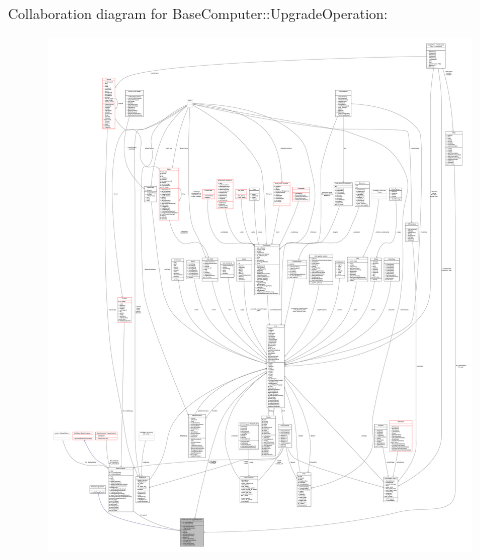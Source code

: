 Collaboration diagram for Base\+Computer\+:\+:Upgrade\+Operation\+:
\nopagebreak
\begin{figure}[H]
\begin{center}
\leavevmode
\includegraphics[width=350pt]{de/d04/classBaseComputer_1_1UpgradeOperation__coll__graph}
\end{center}
\end{figure}
